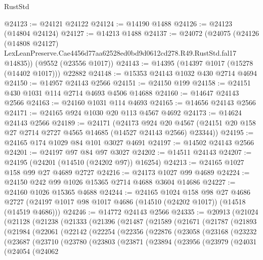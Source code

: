 \begin{lexlean}{RustStd}
\begin{coremodule}
@24123 := @24121 @24122
@24124 := @14190 @1488
@24126 := @24123 (@14804 @24124)
@24127 := @14213 @1488
@24137 := @24072
    (@24075
      (@24126
        (@14808 @24127)
        LexLeanPreserve.Cae4456d77aa62528ed0bd9d0612cd278.R49.RustStd.fal17
        @14835))
    (@9552 (@23556 @1017))
@24143 := @14395 (@14397 @1017 (@15278 (@14402 @1017))) @22882
@24148 := @15353 @24143 @1032 @430 @2714 @4694
@24150 := @14957 @24143 @2566
@24151 := @24150 @199
@24158 := @24151 @430 @1031 @114 @2714 @4693 @4506 @14688
@24160 := @14647 @24143 @2566
@24163 := @24160 @1031 @114 @4693
@24165 := @14656 @24143 @2566
@24171 := @24165 @924 @1030 @20 @113 @4567 @4692
@24173 := @14624 @24143 @2566
@24189 := @24171
    (@24173
      @924
      @20
      @4567
      (@24151 @20 @158 @27 @2714 @2727 @4565 @14685 (@14527 @24143 @2566) @23344))
@24195 := @24165 @174 @1029 @84 @101 @3027 @4691
@24197 := @14502 @24143 @2566
@24201 := @24197 @97 @84 @97 @3027
@24202 := @14511 @24143
@24207 := @24195 (@24201 (@14510 (@24202 @97)) @16254)
@24213 := @24165 @1027 @158 @99 @27 @4689 @2727
@24216 := @24173 @1027 @99 @4689
@24224 := @24150 @242 @99 @1026 @15365 @2714 @4688 @3604 @14686
@24227 := @24160 @1026 @15365 @4688
@24244 := @24165
    @1024
    @158
    @98
    @27
    @4686
    @2727
    (@24197 @1017 @98 @1017 @4686 (@14510 (@24202 @1017)) (@14518 (@14519 @4686)))
@24246 := @14772 @24143 @2566
@24335 := @20913
    (@21024
      (@21128
        (@21238
          (@21333
            (@21396
              (@21487
                (@21589
                  (@21671
                    (@21787
                      (@21893
                        (@21984
                          (@22061
                            (@22142
                              (@22254
                                (@22356
                                  (@22876
                                    (@23058
                                      (@23168
                                        (@23232
                                          (@23687
                                            (@23710
                                              (@23780
                                                (@23803
                                                  (@23871
                                                    (@23894
                                                      (@23956
                                                        (@23979
                                                          (@24031
                                                            (@24054
                                                              (@24062

\end{coremodule}
\end{lexlean}
